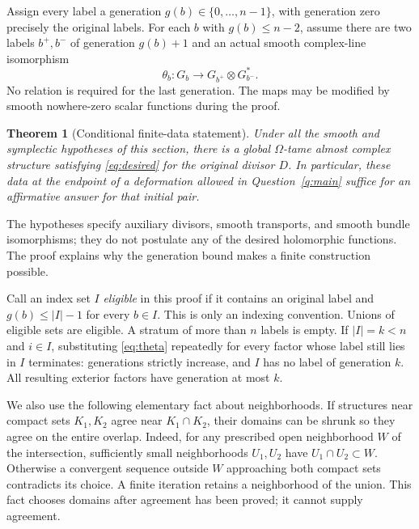 \documentclass[11pt]{article}
\newtheorem{theorem}{Theorem}[section]
\theoremstyle{definition}
\theoremstyle{remark}
\begin{document}
Assign every label a generation $g(b)\in\{0,\ldots,n-1\}$, with generation zero precisely the original labels. For each $b$ with $g(b)\leq n-2$, assume there are two labels $b^+,b^-$ of generation $g(b)+1$ and an actual smooth complex-line isomorphism
\begin{equation}\label{eq:theta}
 \theta_b:G_b\longrightarrow G_{b^+}\otimes G_{b^-}^*.
\end{equation}
No relation is required for the last generation. The maps may be modified by smooth nowhere-zero scalar functions during the proof.

\begin{theorem}[Conditional finite-data statement]\label{thm:conditional}
Under all the smooth and symplectic hypotheses of this section, there is a global $\Omega$-tame almost complex structure satisfying \eqref{eq:desired} for the original divisor $D$. In particular, these data at the endpoint of a deformation allowed in Question~\ref{q:main} suffice for an affirmative answer for that initial pair.
\end{theorem}
The hypotheses specify auxiliary divisors, smooth transports, and smooth bundle isomorphisms; they do not postulate any of the desired holomorphic functions. The proof explains why the generation bound makes a finite construction possible.

Call an index set $I$ \emph{eligible} in this proof if it contains an original label and $g(b)\leq |I|-1$ for every $b\in I$. This is only an indexing convention. Unions of eligible sets are eligible. A stratum of more than $n$ labels is empty. If $|I|=k<n$ and $i\in I$, substituting \eqref{eq:theta} repeatedly for every factor whose label still lies in $I$ terminates: generations strictly increase, and $I$ has no label of generation $k$. All resulting exterior factors have generation at most $k$.

We also use the following elementary fact about neighborhoods. If structures near compact sets $K_1,K_2$ agree near $K_1\cap K_2$, their domains can be shrunk so they agree on the entire overlap. Indeed, for any prescribed open neighborhood $W$ of the intersection, sufficiently small neighborhoods $U_1,U_2$ have $U_1\cap U_2\subset W$. Otherwise a convergent sequence outside $W$ approaching both compact sets contradicts its choice. A finite iteration retains a neighborhood of the union. This fact chooses domains after agreement has been proved; it cannot supply agreement.

\end{document}
